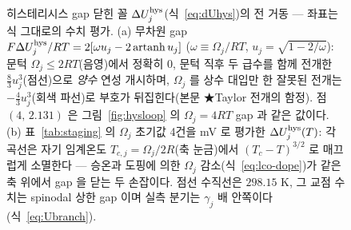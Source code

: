 \begin{figure}[t]
{%
}
\caption{히스테리시스 gap 닫힌 꼴 $\Delta U_j^{\mathrm{hys}}$(식~\eqref{eq:dUhys})의 전 거동 --- 좌표는 식
그대로의 수치 평가. (a) 무차원 gap $F\Delta U_j^{\mathrm{hys}}/RT=2[\omega u_j-2\,\mathrm{artanh}\,u_j]$
($\omega\equiv\Omega_j/RT$, $u_j=\sqrt{1-2/\omega}$): 문턱 $\Omega_j\le2RT$(음영)에서 정확히 $0$,
문턱 직후 두 급수를 함께 전개한 $\tfrac83u_j^3$(점선)으로 \emph{양수} 연성 개시하며, $\Omega_j$ 를
상수 대입만 한 잘못된 전개는 $-\tfrac43u_j^3$(회색 파선)로 부호가 뒤집힌다(본문 ★Taylor 전개의 함정).
점 $(4,\,2.131)$ 은 그림~\ref{fig:hysloop} 의 $\Omega_j{=}4RT$ gap 과 같은 값이다.
(b) 표~\ref{tab:staging} 의 $\Omega_j$ 초기값 4건을 mV 로 평가한 $\Delta U_j^{\mathrm{hys}}(T)$: 각 곡선은
자기 임계온도 $T_{c,j}=\Omega_j/2R$(축 눈금)에서 $(T_c-T)^{3/2}$ 로 매끄럽게 소멸한다 --- 승온과
도핑에 의한 $\Omega_j$ 감소(식~\eqref{eq:lco-dope})가 같은 축 위에서 gap 을 닫는 두 손잡이다.
점선 수직선은 $298.15$ K, 그 교점 수치는 spinodal 상한 gap 이며 실측 분기는 $\gamma_j$ 배 안쪽이다
(식~\eqref{eq:Ubranch}).}
\label{fig:hysgap}
\end{figure}

